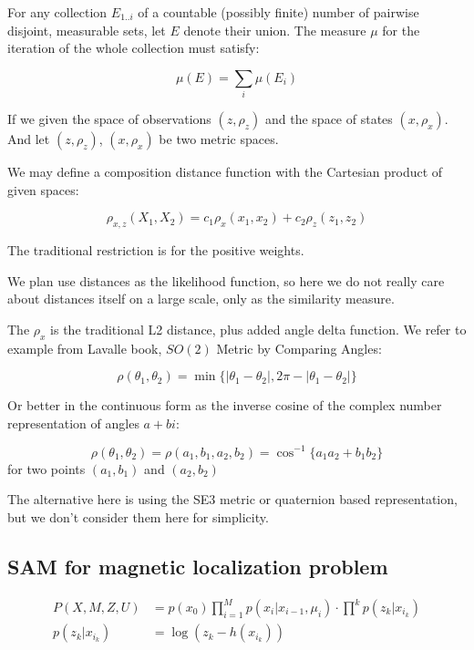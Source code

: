 \documentclass[a4paper, 12pt]{article}
\begin{document}
For any collection $E_{1..i}$ of a countable (possibly finite) number of pairwise disjoint, measurable sets, let $E$ denote their union. 
The measure $\mu$ for the iteration of the whole collection must satisfy:

\begin{equation*}
	\mu(E) = \sum_i \mu(E_i)
\end{equation*}

If we given the space of observations $(z, \rho_z)$ and the space of states $(x, \rho_x)$. And let $(z, \rho_z)$,   $(x, \rho_x)$ be two metric spaces.

We may define a composition distance function with the Cartesian product of given spaces:

\begin{equation}
	\rho_{x, z} (X_1, X_2) = c_1\rho_x (x_1, x_2) + c_2\rho_z (z_1, z_2)
\end{equation}

The traditional restriction is for the positive weights.

We plan use distances as the likelihood function, so here we do not really care about distances itself on a large scale, only as the similarity measure.

The $\rho_x$ is the traditional L2 distance, plus added angle delta function.
We refer to example from Lavalle book, $SO(2)$ Metric by Comparing Angles:

\begin{equation}
\rho(\theta_1, \theta_2) = \min\{|\theta_1 - \theta_2|, 2\pi - |\theta_1 - \theta_2|\}
\end{equation}

Or better in the continuous form as the inverse cosine of the complex number representation of angles $a + b i$:

\begin{equation}
\rho(\theta_1, \theta_2) =  \rho(a_1, b_1, a_2, b_2) = \cos^{-1}\{a_1 a_2 + b_1 b_2\}
\end{equation}
for two points $(a_1 , b_1 )$ and $(a_2 , b_2 )$

The alternative here is using the SE3 metric or quaternion based representation, but we don't consider them here for simplicity.

\subsection{SAM for magnetic localization problem}

\begin{align}
	P(X, M, Z, U) &= p(x_0)\prod_{i=1}^{M}p(x_i|x_{i-1}, \mu_i)\cdot \prod^{k}p(z_k|x_{i_k}) \\
	p(z_k|x_{i_k}) &= \log(z_k - h(x_{i_k}))
\end{align}
\end{document}
